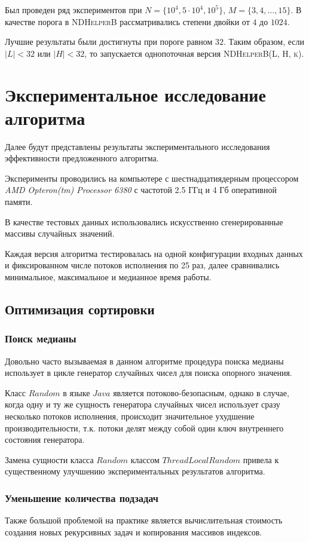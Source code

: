 Был проведен ряд экспериментов при $N=\{10^4, 5\cdot10^4, 10^5\}$, $M=\{3,4,\ldots,15\}$.
В качестве порога в \textsc{NDHelperB} рассматривались степени двойки от $4$ до $1024$.

Лучшие результаты были достигнуты при пороге равном $32$.
Таким образом, если $|L| < 32$ или $|H| < 32$, то запускается однопоточная версия \textsc{NDHelperB(L, H, k)}.

\section{Экспериментальное исследование алгоритма}
Далее будут представлены результаты экспериментального исследования эффективности предложенного алгоритма.

Эксперименты проводились на компьютере с шестнадцатиядерным процессором \textit{AMD Opteron(tm) Processor 6380} с частотой 2.5 ГГц и 4 Гб оперативной памяти.

В качестве тестовых данных использовались искусственно сгенерированные массивы случайных значений. 

Каждая версия алгоритма тестировалась на одной конфигурации входных данных и фиксированном числе потоков исполнения по 25 раз, далее сравнивались минимальное, максимальное и медианное время работы.



\subsection{Оптимизация сортировки}
\subsubsection{Поиск медианы}
Довольно часто вызываемая в данном алгоритме процедура поиска медианы использует в цикле генератор случайных чисел для поиска опорного значения.

Класс $Random$ в языке $Java$ является потоково-безопасным, однако в случае, когда одну и ту же сущность генератора случайных чисел использует сразу несколько потоков исполнения, происходит значительное ухудшение производительности, т.к. потоки делят между собой один ключ внутреннего состояния генератора.

Замена сущности класса $Random$ классом $ThreadLocalRandom$ привела к существенному улучшению экспериментальных результатов алгоритма.

\subsubsection{Уменьшение количества подзадач}
Также большой проблемой на практике является вычислительная стоимость создания новых рекурсивных задач и копирования массивов индексов.

